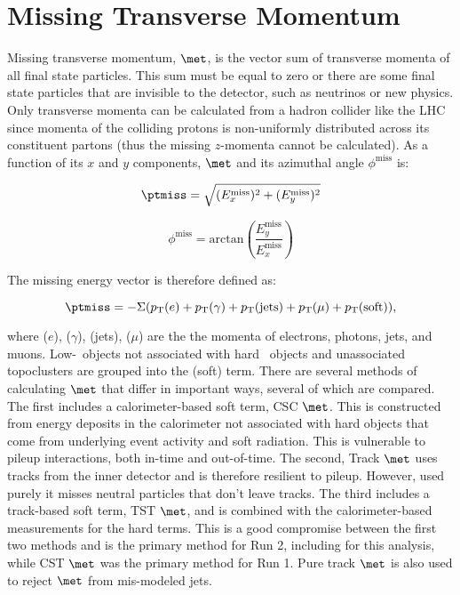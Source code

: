 \section{Missing Transverse Momentum} \label{sec:met}

Missing transverse momentum, $\met$, is the vector sum of transverse momenta of all final state particles.  This sum must be equal to zero or there are some final state particles that are invisible to the detector, such as neutrinos or new physics.  Only transverse momenta can be calculated from a hadron collider like the LHC since momenta of the colliding protons is non-uniformly distributed across its constituent partons (thus the missing $z$-momenta cannot be calculated).  As a function of its $x$ and $y$ components, $\met$ and its azimuthal angle $\phi^{\mathrm{miss}}$ is:

\begin{equation}
\ptmiss = \sqrt{(E_{x}^{\mathrm{miss}})^2 + (E_{y}^{\mathrm{miss}})^2}
\end{equation}

\begin{equation}
\phi^{\mathrm{miss}} = \mathrm{arctan}(\frac{E_{y}^{\mathrm{miss}}}{E_{x}^{\mathrm{miss}}})
\end{equation}


The missing energy vector is therefore defined as:

\begin{equation}
\ptmiss = -\Sigma(\pt(e) + \pt(\gamma) + \pt({\rm jets}) + \pt(\mu) + \pt({\rm soft})),
\label{eq:met}
\end{equation}


where \pt($e$), \pt($\gamma$), \pt(jets), \pt($\mu$) are the the momenta of electrons, photons, jets, and muons.   Low-\pt\ objects not associated with hard \pt\ objects and unassociated topoclusters are grouped into the \pt(soft) term.  There are several methods of calculating $\met$ that differ in important ways, several of which are compared\cite{metrun2}. \\

The first  includes a calorimeter-based soft term, CSC $\met$.  This is constructed from energy deposits in the calorimeter not associated with hard objects that come from underlying event activity and soft radiation.  This is vulnerable to pileup interactions, both in-time and out-of-time.  The second, Track $\met$ uses tracks from the inner detector and is therefore resilient to pileup.  However, used purely it misses neutral particles that don't leave tracks.  The third includes a track-based soft term, TST $\met$, and is combined with the calorimeter-based measurements for the hard terms.  This is a good compromise between the first two methods and is the primary method for Run 2, including for this analysis, while CST $\met$ was the primary method for Run 1.  Pure track $\met$ is also used to reject $\met$ from mis-modeled jets.\\

